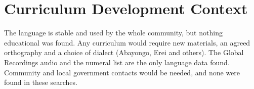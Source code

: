 \documentclass[12pt]{article}
\begin{document}
\section{Curriculum Development Context}
The language is stable and used by the whole community, but nothing educational was found. Any curriculum would require new materials, an agreed orthography and a choice of dialect (Abayongo, Erei and others). The Global Recordings audio and the numeral list are the only language data found. Community and local government contacts would be needed, and none were found in these searches.
\end{document}

